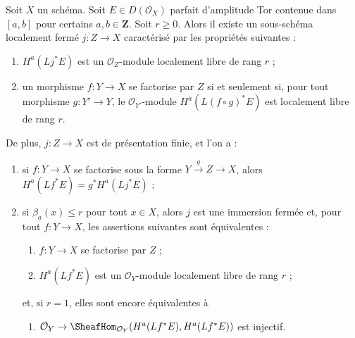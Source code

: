 \begin{lemma}
\label{lemma-locally-closed-where-H0-locally-free}
Soit $X$ un schéma. Soit $E \in D(\mathcal{O}_X)$ parfait
d'amplitude Tor contenue dans $[a, b]$ pour certains $a, b \in \mathbf{Z}$.
Soit $r \geq 0$.
Alors il existe un sous-schéma localement fermé $j : Z \to X$
caractérisé par les propriétés suivantes :
\begin{enumerate}
\item $H^a(Lj^*E)$ est un $\mathcal{O}_Z$-module localement libre de rang $r$ ;
\item un morphisme $f : Y \to X$ se factorise par $Z$
si et seulement si, pour tout morphisme $g : Y' \to Y$, le
$\mathcal{O}_{Y'}$-module $H^a(L(f \circ g)^*E)$ est localement libre
de rang $r$.
\end{enumerate}
De plus, $j : Z \to X$ est de présentation finie, et l'on a :
\begin{enumerate}
\item[(3)] si $f : Y \to X$ se factorise sous la forme $Y \xrightarrow{g} Z \to X$, alors
$H^a(Lf^*E) = g^*H^a(Lj^*E)$ ;
\item[(4)] si $\beta_a(x) \leq r$ pour tout $x \in X$, alors
$j$ est une immersion fermée et, pour tout $f : Y \to X$, les assertions suivantes
sont équivalentes :
\begin{enumerate}
\item $f : Y \to X$ se factorise par $Z$ ;
\item $H^a(Lf^*E)$ est un $\mathcal{O}_Y$-module localement libre de rang $r$ ;
\end{enumerate}
et, si $r = 1$, elles sont encore équivalentes à
\begin{enumerate}
\item[(c)] $\mathcal{O}_Y \to \SheafHom_{\mathcal{O}_Y}(H^a(Lf^*E), H^a(Lf^*E))$
est injectif.
\end{enumerate}
\end{enumerate}
\end{lemma}

